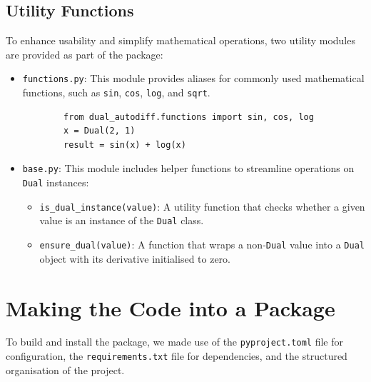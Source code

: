 \documentclass[a4paper,12pt]{article}
\begin{document}
    \subsection{Utility Functions}
    
    To enhance usability and simplify mathematical operations, two utility modules are provided as part of the package:
    
    \begin{itemize}
        \item \texttt{functions.py}: This module provides aliases for commonly used mathematical functions, such as \texttt{sin}, \texttt{cos}, \texttt{log}, and \texttt{sqrt}. 
        \begin{verbatim}
        from dual_autodiff.functions import sin, cos, log
        x = Dual(2, 1)
        result = sin(x) + log(x)
        \end{verbatim}
    
        \item \texttt{base.py}: This module includes helper functions to streamline operations on \texttt{Dual} instances:
        \begin{itemize}
            \item \texttt{is\_dual\_instance(value)}: A utility function that checks whether a given value is an instance of the \texttt{Dual} class. 
            \item \texttt{ensure\_dual(value)}: A function that wraps a non-\texttt{Dual} value into a \texttt{Dual} object with its derivative initialised to zero.
        \end{itemize}
    \end{itemize}
    
    \section{Making the Code into a Package}

    To build and install the package, we made use of the \texttt{pyproject.toml} file for configuration, the \texttt{requirements.txt} file for dependencies, and the structured organisation of the project.

    
\end{document}
